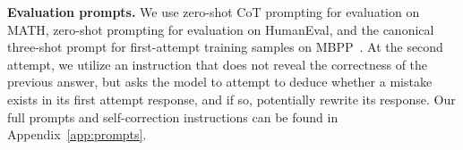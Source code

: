 \begin{table}[]
\centering
\renewcommand{\arraystretch}{1.1}
\caption{\footnotesize{\textbf{Performance of \methodname{} on MATH.} \methodname{} not only attains a higher accuracy at both attempts, but also  provides the most positive self-correction performance $\Delta$\textbf{(t1, t2)}.}}
\vspace{-0.1cm}
\vspace{-0.15cm}
\label{tab:math}
\end{table}


\textbf{Evaluation prompts.} We use zero-shot CoT prompting for evaluation on MATH, zero-shot prompting for evaluation on HumanEval, and the canonical three-shot prompt for first-attempt training samples on MBPP~\citep{austin2021program}.
At the second attempt, we utilize an instruction that does not reveal the correctness of the previous answer, but asks the model to attempt to deduce whether a mistake exists in its first attempt response, and if so, potentially rewrite its response. Our full prompts and self-correction instructions can be found in Appendix~\ref{app:prompts}.

